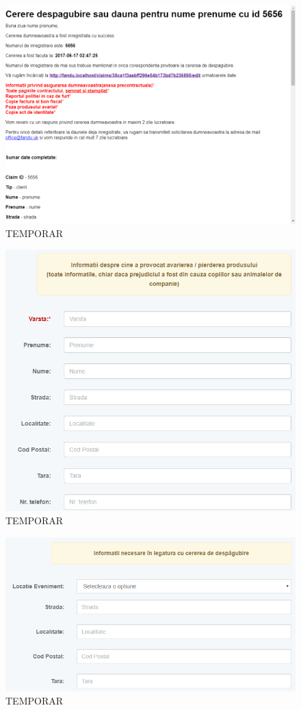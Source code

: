 	\begin{figure}
		\includegraphics[width=\linewidth]{../imagini/message_new_claim.png}
		\caption{TEMPORAR}
		\label{fig:TEMP}
	\end{figure}
	\begin{figure}
		\includegraphics[width=\linewidth]{../imagini/register_avariator.png}
		\caption{TEMPORAR}
		\label{fig:TEMP}
	\end{figure}
	\begin{figure}
		\includegraphics[width=\linewidth]{../imagini/register_cerere_despagubire.png}
		\caption{TEMPORAR}
		\label{fig:TEMP}
	\end{figure}
